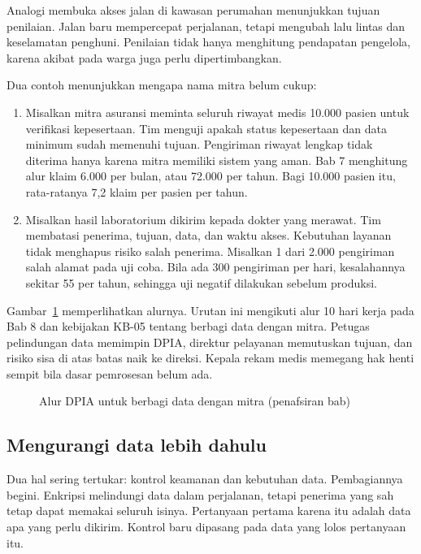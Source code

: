 Analogi membuka akses jalan di kawasan perumahan menunjukkan tujuan penilaian. Jalan baru
mempercepat perjalanan, tetapi mengubah lalu lintas dan keselamatan penghuni. Penilaian tidak hanya
menghitung pendapatan pengelola, karena akibat pada warga juga perlu dipertimbangkan.

Dua contoh menunjukkan mengapa nama mitra belum cukup:
\begin{enumerate}
  \item Misalkan mitra asuransi meminta seluruh riwayat medis 10.000 pasien untuk verifikasi
  kepesertaan. Tim menguji apakah status kepesertaan dan data minimum sudah memenuhi tujuan.
  Pengiriman riwayat lengkap tidak diterima hanya karena mitra memiliki sistem yang aman. Bab 7
  menghitung alur klaim 6.000 per bulan, atau 72.000 per tahun. Bagi 10.000 pasien itu, rata-ratanya
  7,2 klaim per pasien per tahun.
  \item Misalkan hasil laboratorium dikirim kepada dokter yang merawat. Tim membatasi penerima,
  tujuan, data, dan waktu akses. Kebutuhan layanan tidak menghapus risiko salah penerima. Misalkan 1
  dari 2.000 pengiriman salah alamat pada uji coba. Bila ada 300 pengiriman per hari, kesalahannya
  sekitar 55 per tahun, sehingga uji negatif dilakukan sebelum produksi.
\end{enumerate}

Gambar~\ref{fig:ch09-dpia} memperlihatkan alurnya. Urutan ini mengikuti alur 10 hari kerja pada Bab
8 dan kebijakan KB-05 tentang berbagi data dengan mitra. Petugas pelindungan data memimpin DPIA,
direktur pelayanan memutuskan tujuan, dan risiko sisa di atas batas naik ke direksi. Kepala rekam
medis memegang hak henti sempit bila dasar pemrosesan belum ada.

\begin{figure}[!htb]
  \centering
  
  \caption{Alur DPIA untuk berbagi data dengan mitra (penafsiran bab)}
  \label{fig:ch09-dpia}
\end{figure}

\subsection*{Mengurangi data lebih dahulu}

Dua hal sering tertukar: kontrol keamanan dan kebutuhan data. Pembagiannya begini. Enkripsi
melindungi data dalam perjalanan, tetapi penerima yang sah tetap dapat memakai seluruh isinya.
Pertanyaan pertama karena itu adalah data apa yang perlu dikirim. Kontrol baru dipasang pada data
yang lolos pertanyaan itu.

